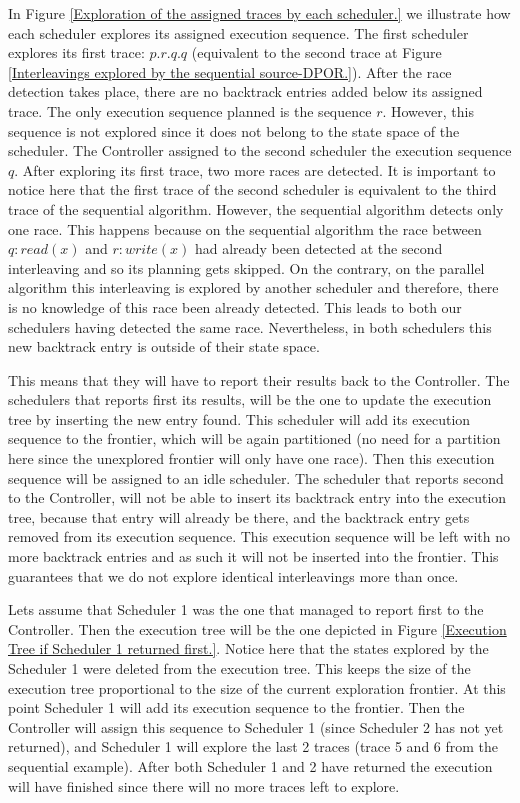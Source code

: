 
In Figure \ref{Exploration of the assigned traces by each scheduler.} we illustrate how each scheduler explores its assigned 
execution sequence. The first scheduler explores its first trace: $p.r.q.q$ (equivalent to the second trace 
at Figure \ref{Interleavings explored by the sequential source-DPOR.}). After the race detection takes place,
there are no backtrack entries added below its assigned trace. The only execution sequence planned is the sequence $r$. However,
this sequence is not explored since it does not belong to the state space of the scheduler. The Controller assigned to the
second scheduler the execution sequence $q$. After exploring its first trace, two more races are detected. It is important to notice
here that the first trace of the second scheduler is equivalent to the third trace of the sequential algorithm. However,
the sequential algorithm detects only one race. This happens because on the sequential algorithm the race between $q: read(x)$ and
$r:write(x)$ had already been detected at the second interleaving and so its planning gets skipped. 
On the contrary, on the parallel algorithm this interleaving
is explored by another scheduler and therefore, there is no knowledge of this race been already detected. This leads to
both our schedulers having detected the same race. Nevertheless, in both schedulers this new backtrack entry is outside of their
state space. 

This means that they will have to report their results back to the Controller. The schedulers that reports first its results, 
will be the one to update the execution tree by inserting the new entry found. This
scheduler will add its execution sequence to the frontier, which will be again partitioned
(no need for a partition here since the unexplored frontier will only have one race). Then this execution sequence will be
assigned to an idle scheduler. The scheduler that reports second to the Controller, will not be able to insert its 
backtrack entry into the execution tree, because that entry will already be there, and the backtrack entry gets removed
from its execution sequence. This execution sequence will be left with no more backtrack entries and as such it will not be
inserted into the frontier. This guarantees that we do not explore identical interleavings more than once.

Lets assume that Scheduler 1 was the one that managed to report first to the Controller. Then the execution tree will be the one
depicted in Figure \ref{Execution Tree if Scheduler 1 returned first.}. Notice here that the states explored by the Scheduler 1
were deleted from the execution tree. This keeps the size of the execution tree proportional to the size of 
the current exploration frontier. At this point Scheduler 1 will add its execution sequence to the frontier. Then the 
Controller will assign this sequence to Scheduler 1 (since Scheduler 2 has not yet returned), and Scheduler 1 will explore
the last 2 traces (trace 5 and 6 from the sequential example). After both Scheduler 1 and 2 have returned the execution 
will have finished since there will no more traces left to explore.


